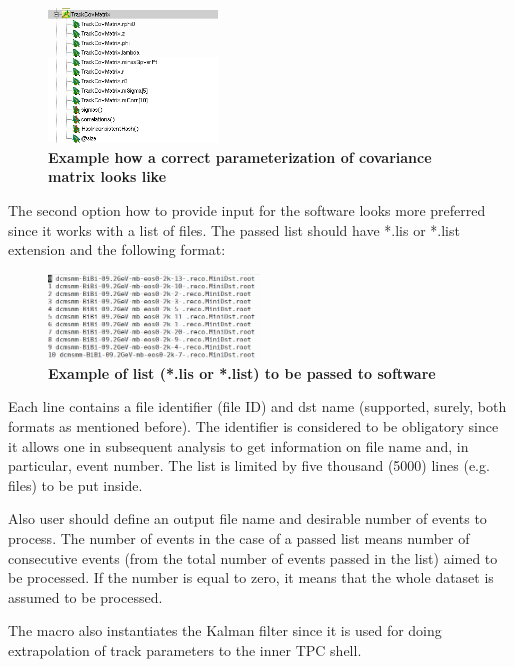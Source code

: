 \documentclass[8pt,a5paper, oldfontcommands]{memoir}
\begin{document}
\begin{figure}[H]
  \centering
  \includegraphics[width=0.4\textwidth]{img/covarMatrix.png}
  \caption{\bf Example how a correct parameterization of covariance matrix looks like}
\end{figure}

The second option how to provide input for the software looks more preferred since it works with a list of files. The passed list should have *.lis or *.list extension and the following format:

\begin{figure}[H]
  \centering
  \includegraphics[width=0.5\textwidth]{img/exampleList.png}
  \caption{\bf Example of list (*.lis or *.list) to be passed to software}
\end{figure}

Each line contains a file identifier (file ID) and dst name (supported, surely, both formats as mentioned before). The identifier is considered to be obligatory since it allows one in subsequent analysis to get information on file name and, in particular, event number.
The list is limited by five thousand (5000) lines (e.g. files) to be put inside.

Also user should define an output file name and desirable number of events to process. The number of events in the case of a passed list means number of consecutive events
(from the total number of events passed in the list) aimed to be processed. If the number is equal to zero, it means that the whole dataset is assumed to be processed. 

The macro also instantiates the Kalman filter since it is used for doing extrapolation of track parameters to the inner TPC shell.
\end{document}
